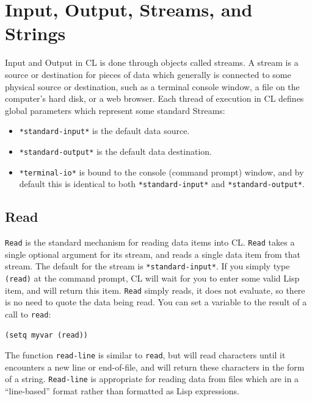\section{Input, Output, Streams, and Strings}

Input and Output in CL is done through objects called streams. A stream is a source
or destination for pieces of data which generally is connected to some physical source or
destination, such as a terminal console window, a file on the computer's hard disk, or a web
browser. Each thread of execution in CL defines global parameters which represent some
standard Streams:

\begin{itemize}
\item \texttt{*standard-input*} is the default data source.
\item \texttt{*standard-output*} is the default data destination.
\item \texttt{*terminal-io*} is bound to the console (command prompt) window, and by default
this is identical to both \texttt{*standard-input*} and \texttt{*standard-output*}.
\end{itemize}

\subsection{Read}

\texttt{Read} is the standard mechanism for reading data items into CL. \texttt{Read} takes a single optional
argument for its stream, and reads a single data item from that stream. The default for the
stream is \texttt{*standard-input*}. If you simply type \texttt{(read)} at the command prompt, CL will
wait for you to enter some valid Lisp item, and will return this item. \texttt{Read} simply reads, it
does not evaluate, so there is no need to quote the data being read. You can set a variable
to the result of a call to \texttt{read}:

\begin{verbatim}
(setq myvar (read))
\end{verbatim}

The function \texttt{read-line} is similar to \texttt{read}, but will read characters until it encounters
a new line or end-of-file, and will return these characters in the form of a string. \texttt{Read-line}
is appropriate for reading data from files which are in a ``line-based'' format rather than
formatted as Lisp expressions.

